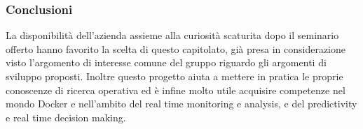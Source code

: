 \subsubsection{Conclusioni}
La disponibilità dell'azienda assieme alla curiosità scaturita dopo il seminario offerto hanno favorito la scelta di questo capitolato, già presa in considerazione visto l'argomento di interesse comune del gruppo riguardo gli argomenti di sviluppo proposti.
Inoltre questo progetto aiuta a mettere in pratica le proprie conoscenze di ricerca operativa ed è infine molto utile acquisire competenze nel mondo Docker e nell'ambito del real time monitoring e analysis, e del predictivity e real time decision making.